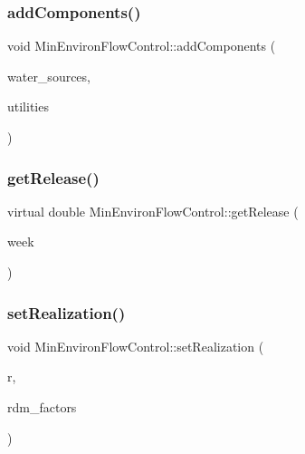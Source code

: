 \subsubsection{\texorpdfstring{add\+Components()}{addComponents()}}
{\footnotesize\ttfamily void Min\+Environ\+Flow\+Control\+::add\+Components (\begin{DoxyParamCaption}\item[{vector$<$ \mbox{\hyperlink{classWaterSource}{Water\+Source}} $\ast$$>$}]{water\+\_\+sources,  }\item[{vector$<$ \mbox{\hyperlink{classUtility}{Utility}} $\ast$$>$}]{utilities }\end{DoxyParamCaption})}

\mbox{\label{classMinEnvironFlowControl_ac7357455a533f7e6882cdb1ef303359b}} 
\subsubsection{\texorpdfstring{get\+Release()}{getRelease()}}
{\footnotesize\ttfamily virtual double Min\+Environ\+Flow\+Control\+::get\+Release (\begin{DoxyParamCaption}\item[{int}]{week }\end{DoxyParamCaption})\hspace{0.3cm}{\ttfamily [pure virtual]}}

\mbox{\label{classMinEnvironFlowControl_a99dd7bb49edc3ae8f919e403ccc92bd9}} 
\subsubsection{\texorpdfstring{set\+Realization()}{setRealization()}}
{\footnotesize\ttfamily void Min\+Environ\+Flow\+Control\+::set\+Realization (\begin{DoxyParamCaption}\item[{unsigned int}]{r,  }\item[{vector$<$ double $>$ \&}]{rdm\+\_\+factors }\end{DoxyParamCaption})\hspace{0.3cm}{\ttfamily [virtual]}}



